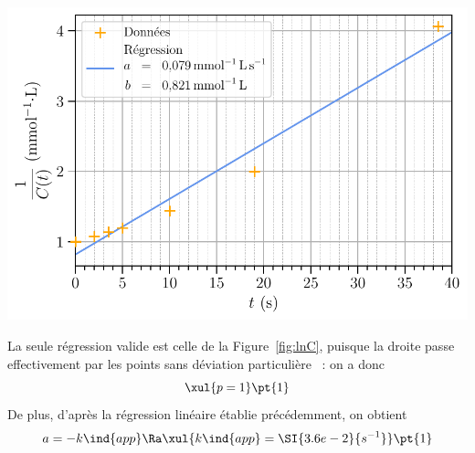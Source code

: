 \documentclass[../DS04.tex]{subfiles}
\begin{document}
{\begin{minipage}[c]{.32\linewidth}
\begin{center}
			\label{fig:lnC}
		\end{center}
	\end{minipage}
	\hfill
	\begin{minipage}[c]{.32\linewidth}
		\begin{center}
			\includegraphics[width=\linewidth]{invc(t)}
		\end{center}
	\end{minipage}
	\bigbreak
	La seule régression valide est celle de la Figure~\ref{fig:lnC}, puisque la
	droite passe effectivement par les points sans déviation particulière ~:
	on a donc
	\[
		\xul{p = 1} \pt{1}
	\]
	De plus, d'après la régression linéaire établie précédemment, on obtient
	\[
		a = -k\ind{app}
		\Ra
		\xul{k\ind{app} = \SI{3.6e-2}{s^{-1}}} \pt{1}
	\]
}%

%
\end{document}
